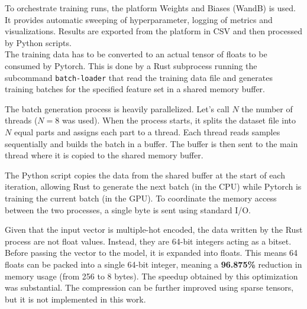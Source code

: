 To orchestrate training runs, the platform Weights and Biases (WandB) is used. It provides automatic sweeping of hyperparameter, logging of metrics and visualizations. Results are exported from the platform in CSV and then processed by Python scripts. \\

The training data has to be converted to an actual tensor of floats to be consumed by Pytorch. This is done by a Rust subprocess running the subcommand \texttt{batch-loader} that read the training data file and generates training batches for the specified feature set in a shared memory buffer.

The batch generation process is heavily parallelized. Let's call $N$ the number of threads ($N=8$ was used). When the process starts, it splits the dataset file into $N$ equal parts and assigns each part to a thread. Each thread reads samples sequentially and builds the batch in a buffer. The buffer is then sent to the main thread where it is copied to the shared memory buffer.

The Python script copies the data from the shared buffer at the start of each iteration, allowing Rust to generate the next batch (in the CPU) while Pytorch is training the current batch (in the GPU). To coordinate the memory access between the two processes, a single byte is sent using standard I/O.

Given that the input vector is multiple-hot encoded, the data written by the Rust process are not float values. Instead, they are 64-bit integers acting as a bitset. Before passing the vector to the model, it is expanded into floats. This means 64 floats can be packed into a single 64-bit integer, meaning a \textbf{96.875\%} reduction in memory usage (from 256 to 8 bytes). The speedup obtained by this optimization was substantial. The compression can be further improved using sparse tensors, but it is not implemented in this work. \\




